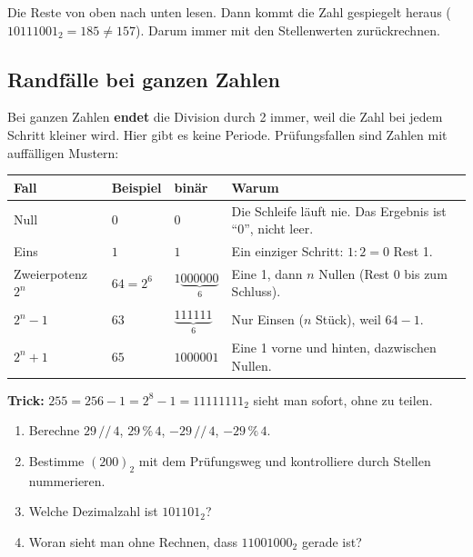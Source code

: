 \begin{fehler}
  Die Reste von oben nach unten lesen. Dann kommt die Zahl gespiegelt heraus
  ($10111001_2 = 185 \ne 157$). Darum immer mit den Stellenwerten zurückrechnen.
\end{fehler}

\subsection*{Randfälle bei ganzen Zahlen}
Bei ganzen Zahlen \textbf{endet} die Division durch 2 immer, weil die Zahl bei jedem
Schritt kleiner wird. Hier gibt es keine Periode. Prüfungsfallen sind
Zahlen mit auffälligen Mustern:
\begin{center}
  \renewcommand{\arraystretch}{1.2}
  \begin{tabularx}{\linewidth}{@{}l l l X@{}}
    \toprule
    Fall & Beispiel & binär & Warum \\
    \midrule
    Null & $0$ & $0$ & Die Schleife läuft nie. Das Ergebnis ist \enquote{0}, nicht leer. \\
    Eins & $1$ & $1$ & Ein einziger Schritt: $1 : 2 = 0$ Rest 1. \\
    Zweierpotenz $2^n$ & $64 = 2^6$ & $1\underbrace{000000}_{6}$ & Eine 1, dann $n$ Nullen (Rest 0 bis zum Schluss). \\
    $2^n - 1$ & $63$ & $\underbrace{111111}_{6}$ & Nur Einsen ($n$ Stück), weil $64 - 1$. \\
    $2^n + 1$ & $65$ & $1000001$ & Eine 1 vorne und hinten, dazwischen Nullen. \\
    \bottomrule
  \end{tabularx}
\end{center}
\textbf{Trick:} $255 = 256 - 1 = 2^8 - 1 = 11111111_2$ sieht man sofort, ohne zu teilen.

\begin{minicheck}
  \begin{enumerate}[resume*=fragen01]
    \item Berechne $29 \,/\!/\, 4$, \; $29 \,\%\, 4$, \; $-29 \,/\!/\, 4$, \; $-29 \,\%\, 4$.
    \item Bestimme $(200)_2$ mit dem Prüfungsweg und kontrolliere durch Stellen nummerieren.
    \item Welche Dezimalzahl ist $101101_2$?
    \item Woran sieht man ohne Rechnen, dass $11001000_2$ gerade ist?
  \end{enumerate}
\end{minicheck}

